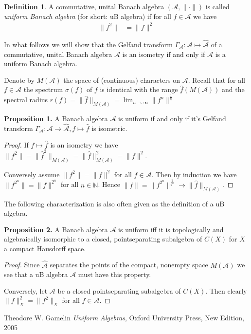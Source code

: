\documentclass[12pt]{article}
\theoremstyle{definition}
\newtheorem*{Def}{Definition}
\theoremstyle{plain}
\begin{document}
\begin{Def}
A commutative, unital Banach algebra $(\mathcal{A}, \|\cdot\|)$ is called \emph{uniform Banach algebra} (for short: uB algebra) if for all $f \in \mathcal{A}$ we have
\begin{align*}
\|f^2\| &= \|f\|^2
\end{align*}
\end{Def}

In what follows we will show that the Gelfand transform $\Gamma_{\mathcal{A}} \colon \mathcal{A} \mapsto \hat{\mathcal{A}}$ of a commutative, unital Banach algebra $\mathcal{A}$ is an isometry if and only if $\mathcal{A}$ is a uniform Banach algebra.

Denote by $M(\mathcal{A})$ the space of (continuous) characters on $\mathcal{A}$. 
Recall that for all $f \in \mathcal{A}$ the spectrum $\sigma(f)$ of $f$ is identical with the range $\hat{f}(M(\mathcal{A}))$ and the spectral radius $r(f) = \|\hat{f}\|_{M(\mathcal{A})} = \lim_{n \to \infty} \|f^n\|^{\frac{1}{n}}$

\textbf{Proposition 1.} A Banach algebra $\mathcal{A}$ is uniform if and only if it's Gelfand transform $\Gamma_{\mathcal{A}} \colon \mathcal{A} \to \hat{\mathcal{A}}, f \mapsto \hat{f}$ is isometric.

\begin{proof}
If $f \mapsto \hat{f}$ is an isometry we have $\|f^2\| = \|\hat{f}^2\|_{M(\mathcal{A})} = \|\hat{f}\|_{M(\mathcal{A})}^2 = \|f\|^2$. 

Conversely assume $\|f^2\| = \|f\|^2$ for all $f \in \mathcal{A}$. Then by induction we have $\|f^{2^n}\| = \|f\|^{2^n}$ for all $n \in \mathbb{N}$. Hence $\|f\| = \|f^{2^n}\|^{\frac{1}{2^n}} \to \|\hat{f}\|_{M(\mathcal{A})}$. 
\end{proof}

The following characterization is also often given as the definition of a uB algebra. 

\textbf{Proposition 2.} A Banach algebra $\mathcal{A}$ is uniform iff it is topologically and algebraically isomorphic to a closed, pointseparating subalgebra of $C(X)$ for $X$ a compact Hausdorff space.

\begin{proof}
Since $\hat{\mathcal{A}}$ separates the points of the compact, nonempty space $M(\mathcal{A})$ we see that a uB algebra $\mathcal{A}$ must have this property.

Conversely, let $\mathcal{A}$ be a closed pointseparating subalgebra of $C(X)$. Then clearly $\|f\|_X^2 = \|f^2\|_X$ for all $f \in \mathcal{A}$. 
\end{proof}

\begin{thebibliography}{99}
 Theodore W. Gamelin \emph{Uniform Algebras}, Oxford University Press, New Edition, 2005
\end{thebibliography}

\end{document}
